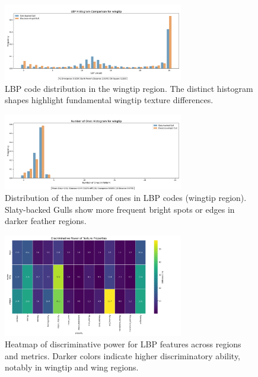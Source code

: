 \documentclass[a4paper,12pt]{report}
\begin{document}
\begin{figure}[H]
    \centering
    \includegraphics[width=0.7\textwidth]{images/Results_LBP_Analysis_Uniform/wingtip_lbp_histogram.png}
    \caption{LBP code distribution in the wingtip region. The distinct histogram shapes highlight fundamental wingtip texture differences.}
    \label{fig:lbp-wingtip}
\end{figure}

\begin{figure}[H]
    \centering
    \includegraphics[width=0.7\textwidth]{images/Results_LBP_Analysis_Uniform/wingtip_ones_histogram.png}
    \caption{Distribution of the number of ones in LBP codes (wingtip region). Slaty-backed Gulls show more frequent bright spots or edges in darker feather regions.}
    \label{fig:ones-wingtip}
\end{figure}

\begin{figure}[H]
    \centering
    \includegraphics[width=0.7\textwidth]{images/Results_LBP_Analysis_Uniform/discriminative_power_heatmap.png}
    \caption{Heatmap of discriminative power for LBP features across regions and metrics. Darker colors indicate higher discriminatory ability, notably in wingtip and wing regions.}
    \label{fig:heatmap}
\end{figure}
\end{document}
